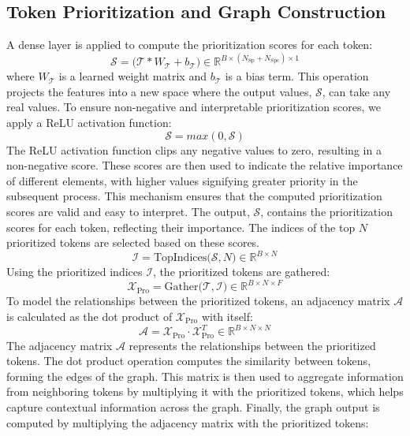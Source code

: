 \documentclass[journal]{IEEEtran}
\begin{document}
\subsection{Token Prioritization and Graph Construction}

A dense layer is applied to compute the prioritization scores for each token:
\begin{equation}
    \mathcal{S} = \big(\mathcal{T} * W_{\mathcal{T}} + b_{\mathcal{T}}\big) \in  \mathbb{R}^{B \times (N_{\text{Sp}} + N_{\text{Spc}}) \times 1} 
\end{equation}
where $W_{\mathcal{T}}$ is a learned weight matrix and $b_{\mathcal{T}}$ is a bias term. This operation projects the features into a new space where the output values, $\mathcal{S}$, can take any real values. To ensure non-negative and interpretable prioritization scores, we apply a ReLU activation function:
\begin{equation}
     \mathcal{S} = max(0,\mathcal{S})
\end{equation}
The ReLU activation function clips any negative values to zero, resulting in a non-negative score. These scores are then used to indicate the relative importance of different elements, with higher values signifying greater priority in the subsequent process. This mechanism ensures that the computed prioritization scores are valid and easy to interpret. The output, $\mathcal{S}$, contains the prioritization scores for each token, reflecting their importance. The indices of the top $N$ prioritized tokens are selected based on these scores.
\begin{equation}
    \mathcal{I} = \text{TopIndices}\big(\mathcal{S},N\big) \in \mathbb{R}^{B\times N}
\end{equation}
Using the prioritized indices $\mathcal{I}$, the prioritized tokens are gathered:
\begin{equation}
    \mathcal{X}_{\text{Pro}} = \text{Gather}\big(\mathcal{T}, \mathcal{I}\big) \in \mathbb{R}^{B \times N \times F}
\end{equation}
To model the relationships between the prioritized tokens, an adjacency matrix $\mathcal{A}$ is calculated as the dot product of $\mathcal{X}_{\text{Pro}}$ with itself:
\begin{equation}
    \mathcal{A} = \mathcal{X}_{\text{Pro}} \cdot \mathcal{X}_{\text{Pro}}^T \in \mathbb{R}^{B \times N \times N}
\end{equation}
The adjacency matrix $\mathcal{A}$ represents the relationships between the prioritized tokens. The dot product operation computes the similarity between tokens, forming the edges of the graph. This matrix is then used to aggregate information from neighboring tokens by multiplying it with the prioritized tokens, which helps capture contextual information across the graph. Finally, the graph output is computed by multiplying the adjacency matrix with the prioritized tokens:
\end{document}
